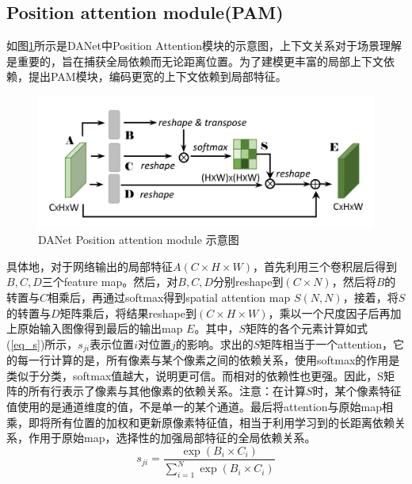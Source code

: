 \documentclass[cn]{elegantbook}
\begin{document}
\subsection{Position attention module(PAM)}
如图\ref{pam2}所示是DANet中Position Attention模块的示意图，上下文关系对于场景理解是重要的，旨在捕获全局依赖而无论距离位置。为了建模更丰富的局部上下文依赖，提出PAM模块，编码更宽的上下文依赖到局部特征。
\begin{figure}[!h]
	\centering
	\includegraphics[width=\textwidth]{images/pam2}
	\caption{\label{pam2}DANet Position attention module 示意图}
\end{figure}
具体地，对于网络输出的局部特征$A(C\times H\times W)$，首先利用三个卷积层后得到$B,C,D$三个feature map。然后，对$B,C,D$分别reshape到$(C\times N)$，然后将$B$的转置与$C$相乘后，再通过softmax得到spatial attention map $S(N,N)$，接着，将$S$的转置与$D$矩阵乘后，将结果reshape到$(C\times H\times W)$，乘以一个尺度因子后再加上原始输入图像得到最后的输出map $E$。其中，$S$矩阵的各个元素计算如式(\ref{eq_s})所示，$s_{ji}$表示位置$i$对位置$j$的影响。求出的$S$矩阵相当于一个attention，它的每一行计算的是，所有像素与某个像素之间的依赖关系，使用softmax的作用是类似于分类，softmax值越大，说明更可信。而相对的依赖性也更强。因此，S矩阵的所有行表示了像素与其他像素的依赖关系。注意：在计算$S$时，某个像素特征值使用的是通道维度的值，不是单一的某个通道。最后将attention与原始map相乘，即将所有位置的加权和更新原像素特征值，相当于利用学习到的长距离依赖关系，作用于原始map，选择性的加强局部特征的全局依赖关系。
\begin{equation}
\label{eq_s}
s_{ji}=\frac{\exp(B_i\times C_i)}{\sum_{i=1}^N\exp(B_i\times C_i)}
\end{equation}
\end{document}
